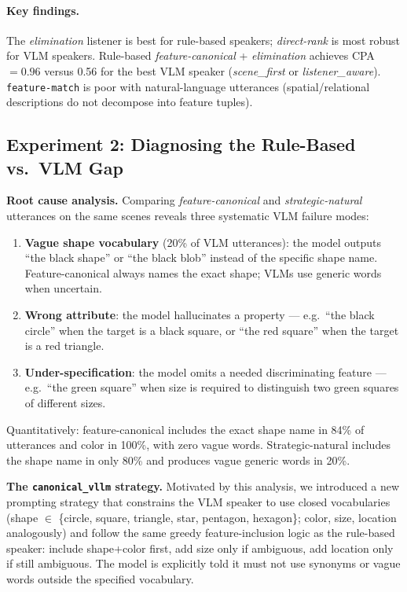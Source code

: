 \documentclass[11pt]{article}
\begin{document}
\paragraph{Key findings.}
The \textit{elimination} listener is best for rule-based speakers;
\textit{direct-rank} is most robust for VLM speakers.
Rule-based \textit{feature-canonical} + \textit{elimination} achieves CPA~$=0.96$
versus 0.56 for the best VLM speaker (\textit{scene\_first} or
\textit{listener\_aware}).
\texttt{feature-match} is poor with natural-language utterances (spatial/relational
descriptions do not decompose into feature tuples).

\subsection{Experiment 2: Diagnosing the Rule-Based vs.\ VLM Gap}
\label{sec:exp2}

\textbf{Root cause analysis.}
Comparing \textit{feature-canonical} and \textit{strategic-natural} utterances
on the same scenes reveals three systematic VLM failure modes:

\begin{enumerate}
    \item \textbf{Vague shape vocabulary} (20\% of VLM utterances): the model outputs
          ``the black shape'' or ``the black blob'' instead of the specific shape name.
          Feature-canonical always names the exact shape; VLMs use generic words
          when uncertain.
    \item \textbf{Wrong attribute}: the model hallucinates a property --- e.g.\
          ``the black circle'' when the target is a black square, or ``the red square''
          when the target is a red triangle.
    \item \textbf{Under-specification}: the model omits a needed discriminating
          feature --- e.g.\ ``the green square'' when size is required to distinguish
          two green squares of different sizes.
\end{enumerate}

Quantitatively: feature-canonical includes the exact shape name in 84\% of utterances
and color in 100\%, with zero vague words.  Strategic-natural includes the shape name
in only 80\% and produces vague generic words in 20\%.

\textbf{The \texttt{canonical\_vllm} strategy.}
Motivated by this analysis, we introduced a new prompting strategy that constrains
the VLM speaker to use closed vocabularies (shape $\in$ \{circle, square, triangle,
star, pentagon, hexagon\}; color, size, location analogously) and follow the same
greedy feature-inclusion logic as the rule-based speaker: include shape+color first,
add size only if ambiguous, add location only if still ambiguous.
The model is explicitly told it must not use synonyms or vague words outside the
specified vocabulary.
\end{document}
